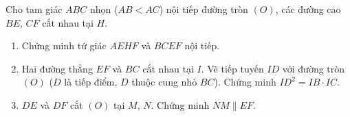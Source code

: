 \begin{ex}%
	Cho tam giác $ABC$ nhọn ($AB<AC$) nội tiếp đường tròn $(O)$, các đường cao $BE$, $CF$ cắt nhau tại $H$.
	\begin{enumerate}
		\item Chứng minh tứ giác $AEHF$ và $BCEF$ nội tiếp.
		\item Hai đường thẳng $EF$ và $BC$ cắt nhau tại $I$. Vẽ tiếp tuyến $ID$ với đường tròn $(O)$ ($D$ là tiếp điểm, $D$ thuộc cung nhỏ $BC$). Chứng minh $ID^2=IB\cdot IC$.
		\item $DE$ và $DF$ cắt $(O)$ tại $M$, $N$. Chứng minh $NM \parallel EF$.
	\end{enumerate}
\end{ex}
